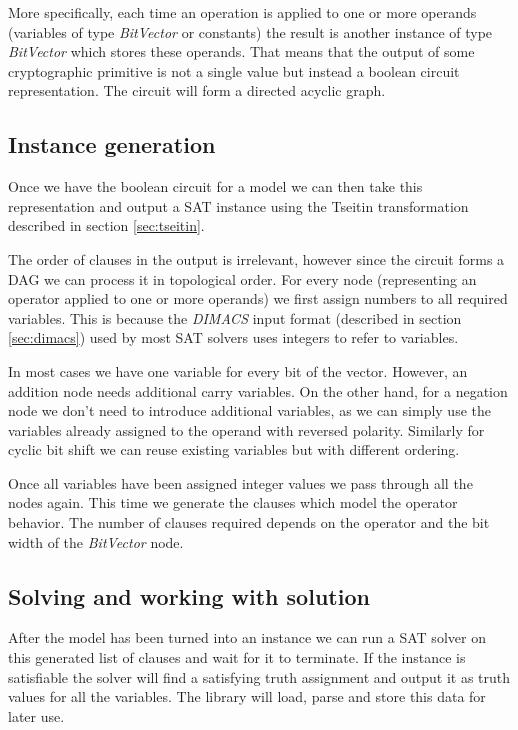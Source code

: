 More specifically, each time an operation is applied to one or more operands (variables of type \emph{BitVector} or constants) the result is another instance of type \emph{BitVector} which stores these operands.  That means that the output of some cryptographic primitive is not a single value but instead a boolean circuit representation. The circuit will form a directed acyclic graph.

\subsection{Instance generation}
Once we have the boolean circuit for a model we can then take this representation and output a SAT instance using the Tseitin transformation described in section \ref{sec:tseitin}.

The order of clauses in the output is irrelevant, however since the circuit forms a DAG we can process it in topological order.
For every node (representing an operator applied to one or more operands) we first assign numbers to all required variables.
This is because the \emph{DIMACS} input format (described in section \ref{sec:dimacs}) used by most SAT solvers uses integers to refer to variables.

In most cases we have one variable for every bit of the vector.
However, an addition node needs additional carry variables.
On the other hand, for a negation node we don't need to introduce additional variables, as we can simply use the variables already assigned to the operand with reversed polarity.
Similarly for cyclic bit shift we can reuse existing variables but with different ordering.

Once all variables have been assigned integer values we pass through all the nodes again.
This time we generate the clauses which model the operator behavior.
The number of clauses required depends on the operator and the bit width of the \emph{BitVector} node.

\subsection{Solving and working with solution}
After the model has been turned into an instance we can run a SAT solver on this generated list of clauses and wait for it to terminate.
If the instance is satisfiable the solver will find a satisfying truth assignment and output it as truth values for all the variables.
The library will load, parse and store this data for later use.

